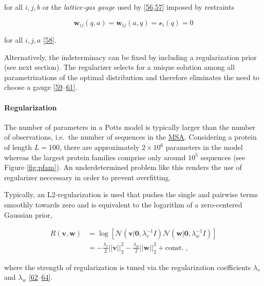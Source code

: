 \documentclass[12pt,a4paper,twoside]{book}
\renewcommand{\v}{\mathbf{v}}
\newcommand{\vi}{\mathcal{v}_{i}}
\newcommand{\w}{\mathbf{w}}
\newcommand{\wij}{\mathbf{w}_{ij}}
\theoremstyle{definition}
\theoremstyle{definition}
\theoremstyle{remark}
\begin{document}
for all \(i,j,b\) or the \emph{lattice-gas gauge} used by
{[}\protect\hyperlink{ref-Morcos2011}{56},\protect\hyperlink{ref-Marks2011}{57}{]}
imposed by restraints

\begin{equation}
    \wij(q,a) = \wij(a,q) = \vi(q) = 0
\label{eq:ising-gauge}
\end{equation}

for all \(i,j,a\) {[}\protect\hyperlink{ref-Cocco2017}{58}{]}.

Alternatively, the indeterminacy can be fixed by including a
regularization prior (see next section). The regularizer selects for a
unique solution among all parametrizations of the optimal distribution
and therefore eliminates the need to choose a gauge
{[}\protect\hyperlink{ref-Koller2009}{59}--\protect\hyperlink{ref-Stein2015a}{61}{]}.

\paragraph{Regularization}\label{regularization}

The number of parameters in a Potts model is typically larger than the
number of observations, i.e.~the number of sequences in the
\protect\hyperlink{abbrev}{MSA}. Considering a protein of length
\(L=100\), there are approximately \(2 \times 10^6\) parameters in the
model whereas the largest protein families comprise only around \(10^5\)
sequences (see Figure \ref{fig:pfam}). An underdetermined problem like
this renders the use of regularizer neccessary in order to prevent
overfitting.

Typically, an L2-regularization is used that pushes the single and
pairwise terms smoothly towards zero and is equivalent to the logarithm
of a zero-centered Gaussian prior,

\begin{align}
  R(\v, \w)  &= \log \left[ \mathcal{N}(\v | \mathbf{0}, \lambda_v^{-1} I) \mathcal{N}(\w | \mathbf{0}, \lambda_w^{-1} I) \right] \\
             &= -\frac{\lambda_v}{2} ||\v||_2^2 - \frac{\lambda_w}{2} ||\w||_2^2 + \text{const.} \; ,
\label{eq:l2-reg}
\end{align}

where the strength of regularization is tuned via the regularization
coefficients \(\lambda_v\) and \(\lambda_w\)
{[}\protect\hyperlink{ref-Seemayer2014}{62}--\protect\hyperlink{ref-Kamisetty2013}{64}{]}.
\end{document}
